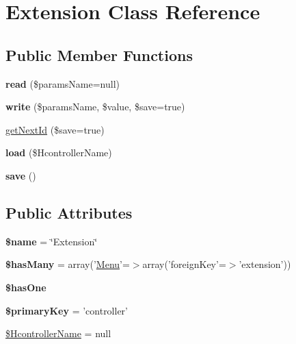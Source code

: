 \hypertarget{class_extension}{
\section{\-Extension \-Class \-Reference}
\label{class_extension}
}
\subsection*{\-Public \-Member \-Functions}
\begin{DoxyCompactItemize}
\item 
\hypertarget{class_extension_ac97ad3a211910055ea89cca0cbfe96ea}{
{\bfseries read} (\$params\-Name=null)}
\label{class_extension_ac97ad3a211910055ea89cca0cbfe96ea}

\item 
\hypertarget{class_extension_ac8ce4bef9e66e64c4b6e8e3d7691433e}{
{\bfseries write} (\$params\-Name, \$value, \$save=true)}
\label{class_extension_ac8ce4bef9e66e64c4b6e8e3d7691433e}

\item 
\hyperlink{class_extension_ae978d04dce890b761ac3879e3b74375c}{get\-Next\-Id} (\$save=true)
\item 
\hypertarget{class_extension_ab459c435ce5174daebe9522f93280fbe}{
{\bfseries load} (\$\-Hcontroller\-Name)}
\label{class_extension_ab459c435ce5174daebe9522f93280fbe}

\item 
\hypertarget{class_extension_a67fa5f6af1ed44e7635a022436a7c5c3}{
{\bfseries save} ()}
\label{class_extension_a67fa5f6af1ed44e7635a022436a7c5c3}

\end{DoxyCompactItemize}
\subsection*{\-Public \-Attributes}
\begin{DoxyCompactItemize}
\item 
\hypertarget{class_extension_a42ebad8a8c0a6300012daf8df5de872c}{
{\bfseries \$name} = \char`\"{}\-Extension\char`\"{}}
\label{class_extension_a42ebad8a8c0a6300012daf8df5de872c}

\item 
\hypertarget{class_extension_a298f61dc8a744785ea9e38fbb1a9bd94}{
{\bfseries \$has\-Many} = array('\hyperlink{class_menu}{\-Menu}'=$>$array('foreign\-Key'=$>$'extension'))}
\label{class_extension_a298f61dc8a744785ea9e38fbb1a9bd94}

\item 
{\bfseries \$has\-One}
\item 
\hypertarget{class_extension_a0e11c9a38d0ae1925507f18de6df7c69}{
{\bfseries \$primary\-Key} = 'controller'}
\label{class_extension_a0e11c9a38d0ae1925507f18de6df7c69}

\item 
\hyperlink{class_extension_adfc9e9443f5548da5fb81846472bfe92}{\$\-Hcontroller\-Name} = null
\end{DoxyCompactItemize}


